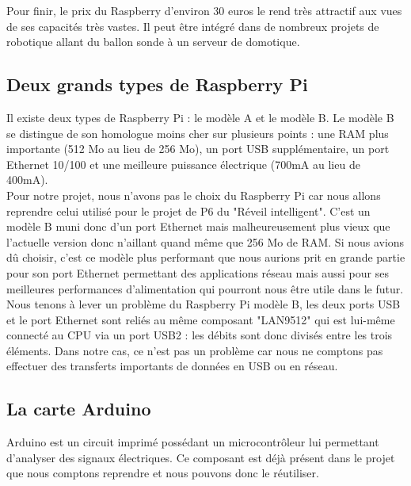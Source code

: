 \documentclass[a4paper, 12pt, french]{article}
\begin{document}
Pour finir, le prix du Raspberry d'environ 30 euros le rend très attractif aux vues de ses capacités très vastes. Il peut être intégré dans de nombreux projets de robotique allant du ballon sonde à un serveur de domotique.\\

\subsection{Deux grands types de Raspberry Pi} %
\label{sub:deux_grands_types_de_raspberry_pi}
Il existe deux types de Raspberry Pi : le modèle A et le modèle B. Le modèle B se distingue de son homologue moins cher sur plusieurs points : une RAM plus importante (512 Mo au lieu de 256 Mo), un port USB supplémentaire, un port Ethernet 10/100 et une meilleure puissance électrique (700mA au lieu de 400mA). \\

Pour notre projet, nous n'avons pas le choix du Raspberry Pi car nous allons reprendre celui utilisé pour le projet de P6 du "Réveil intelligent". C'est un modèle B muni donc d'un port Ethernet mais malheureusement plus vieux que l'actuelle version donc n'aillant quand même que 256 Mo de RAM. Si nous avions dû choisir, c'est ce modèle plus performant que nous aurions prit en grande partie pour son port Ethernet permettant des applications réseau mais aussi pour ses meilleures performances d'alimentation qui pourront nous être utile dans le futur.\\

Nous tenons à lever un problème du Raspberry Pi modèle B, les deux ports USB et le port Ethernet sont reliés au même composant "LAN9512" qui est lui-même connecté au CPU via un port USB2 : les débits sont donc divisés entre les trois éléments. Dans notre cas, ce n'est pas un problème car nous ne comptons pas effectuer des transferts importants de données en USB ou en réseau.\\ 

\subsection{La carte Arduino} %
\label{sub:la_carte_arduino}
Arduino est un circuit imprimé possédant un microcontrôleur lui permettant d'analyser des signaux électriques. Ce composant est déjà présent dans le projet que nous comptons reprendre et nous pouvons donc le réutiliser. \\
\end{document}
